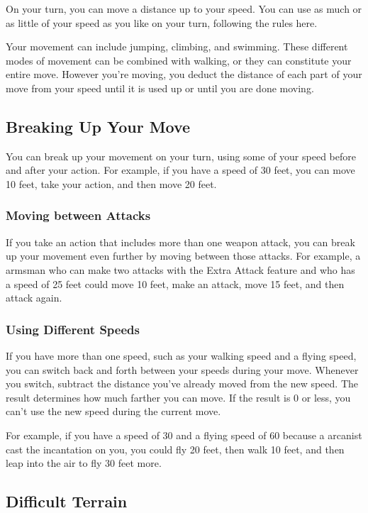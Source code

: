 On your turn, you can move a distance up to your speed. You can use as much or as little of your speed as you like on your turn, following the rules here.

Your movement can include jumping, climbing, and swimming. These different modes of movement can be combined with walking, or they can constitute your entire move. However you're moving, you deduct the distance of each part of your move from your speed until it is used up or until you are done moving.

\subsection{Breaking Up Your Move}

You can break up your movement on your turn, using some of your speed before and after your action. For example, if you have a speed of 30 feet, you can move 10 feet, take your action, and then move 20 feet.

\subsubsection{Moving between Attacks}

If you take an action that includes more than one weapon attack, you can break up your movement even further by moving between those attacks. For example, a armsman who can make two attacks with the Extra Attack feature and who has a speed of 25 feet could move 10 feet, make an attack, move 15 feet, and then attack again.

\subsubsection{Using Different Speeds}

If you have more than one speed, such as your walking speed and a flying speed, you can switch back and forth between your speeds during your move. Whenever you switch, subtract the distance you've already moved from the new speed. The result determines how much farther you can move. If the result is 0 or less, you can't use the new speed during the current move.

For example, if you have a speed of 30 and a flying speed of 60 because a arcanist cast the  incantation on you, you could fly 20 feet, then walk 10 feet, and then leap into the air to fly 30 feet more.

\subsection{Difficult Terrain}

